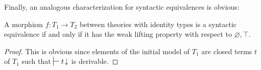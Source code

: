 \documentclass[reqno]{amsart}
\theoremstyle{definition}
\theoremstyle{remark}
\newcommand{\I}{\mathrm{I}}
\numberwithin{figure}{section}
\begin{document}
Finally, an analogous characterization for syntactic equivalences is obvious:

\begin{prop}
A morphism $f : T_1 \to T_2$ between theories with identity types is a syntactic equivalence if and only if it has the weak lifting property with respect to $\varnothing,\top$.
\end{prop}
\begin{proof}
This is obvious since elements of the initial model of $T_1$ are closed terms $t$ of $T_1$ such that $\sststile{}{} t\!\downarrow$ is derivable.
\end{proof}

\begin{comment}
This proposition implies that Morita equivalences can be characterized in terms of a lifting property.
Let $\I$ be the set of the following morphisms of theories:
For every predicate symbol $P : s_1 \times \ldots \times s_k$ and every function symbols $A : s_1 \times \ldots \times s_k \to (d_p,n)$ and $a : s_1 \times \ldots \times s_k \to (p,n)$,
let $i_{P,A,a}$ be the following morphism of theories:
\[ \{ P(x_1, \ldots x_k) \sststile{}{x_1, \ldots x_k} A(x_1, \ldots x_k)\!\downarrow \} \to \{ P(x_1, \ldots x_k) \sststile{}{x_1, \ldots x_k} a(x_1, \ldots x_k)\!\downarrow \}, \]
where $i_{P,A,a}(A) = e_p(a)$.
We can define a relative cylinder object for $i_{P,A,a}$ as
\[ \{ P(x_1, \ldots x_k) \sststile{}{x_1, \ldots x_k} e_p(h(x_1, \ldots x_k)) = I \times A(x_1, \ldots x_k) \}, \]
where $h : s_1 \times \ldots \times s_k \to (p,n+1)$.
Then the previous proposition immediately implies the following corollary:

\begin{cor}
A morphism of theories is a Morita equivalence if and only if it has RLP up to relative homotopy with respect to $\I$.
\end{cor}

If we want to prove that a morphism $f : T_1 \to T_2$ is a Morita equivalence, we can try to use the same idea as in the proof of \cite[Lemma~3.7]{alg-models}.
We define functions $g : Term_{T_2}(V)_{(p,n)} \to Term_{T_1}(V)_{(p,n)}$ and $h : Term_{T_2}(V)_{(p,n)} \to Term_{T_2}(V)_{(p,n+1)}$.
To show that $g(a)$ and $h(a)$ satisfy conditions of \rprop{str-morita-char}, we need to prove several properties of $g$ and $h$,
one of which is that they must preserve axioms of $T_2$.
The problem with this construction is that they might not preserve all axioms.
Often we have some axioms that express reduction rules.
If $g$ and $h$ do not preserve these axioms, then we can try to fix this problem by first applying a normalization function.
Such function usually does not preserve substitutions and thus does not define morphisms of theories.
We call such functions \emph{pseudomorphisms}:


\end{comment}
\end{document}
